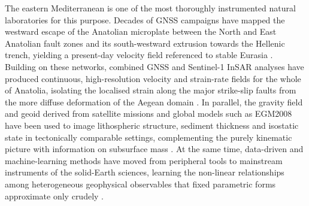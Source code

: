 \documentclass[pdflatex,sn-mathphys-num]{sn-jnl}%
\theoremstyle{thmstyleone}%
\theoremstyle{thmstyletwo}%
\theoremstyle{thmstylethree}%
\begin{document}
The eastern Mediterranean is one of the most thoroughly instrumented natural
laboratories for this purpose. Decades of GNSS campaigns have mapped the westward
escape of the Anatolian microplate between the North and East Anatolian fault zones
and its south-westward extrusion towards the Hellenic trench, yielding a
present-day velocity field referenced to stable Eurasia
\cite{Nocquet2012,Kurt2023}. Building on these networks,
combined GNSS and Sentinel-1 InSAR analyses have produced continuous,
high-resolution velocity and strain-rate fields for the whole of Anatolia, isolating
the localised strain along the major strike-slip faults from the more diffuse
deformation of the Aegean domain \cite{England2016,Weiss2020,Kreemer2003,Hollenstein2008,Berardino2002,Ferretti2001,Hussain2018}. In
parallel, the gravity field and geoid derived from satellite missions and global
models such as EGM2008 have been used to image lithospheric structure, sediment
thickness and isostatic state in tectonically comparable settings, complementing the
purely kinematic picture with information on subsurface mass
\cite{Pavlis2012,Sandwell2014,Lemenkova202216,Foerste2014,Ince2019,Hirt2013,HofmannWellenhof2006,Tapley2004,Farr2007}. At the same time,
data-driven and machine-learning methods have moved from peripheral tools to
mainstream instruments of the solid-Earth sciences, learning the non-linear
relationships among heterogeneous geophysical observables that fixed parametric
forms approximate only crudely
\cite{Bergen2019,Reichstein2019,MousaviBeroza2023,Lemenkova202518,LeCun2015,DeVries2018,Dramsch2020,Lary2016,Karpatne2019,Breiman2001,ChenGuestrin2016}.
\end{document}
